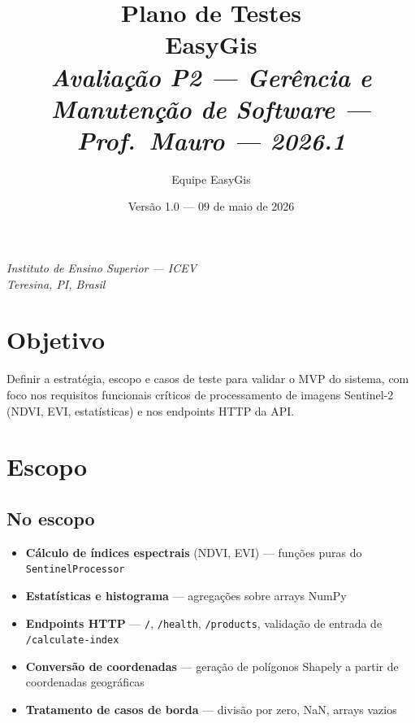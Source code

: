 \documentclass[11pt, a4paper]{article}
\title{%
  \vspace{-1.5cm}
  {\Huge\bfseries\color{accentdim} Plano de Testes}\\[8pt]
  {\Large\bfseries EasyGis}\\[18pt]
  {\normalsize\itshape Avaliação P2 --- Gerência e Manutenção de Software --- Prof.\ Mauro --- 2026.1}
}
\author{Equipe EasyGis}
\date{Versão 1.0 --- 09 de maio de 2026}
\begin{document}
\maketitle
\thispagestyle{empty}

\vfill
\begin{center}
\small\textit{Instituto de Ensino Superior --- ICEV}\\
\small\textit{Teresina, PI, Brasil}
\end{center}
\newpage

\tableofcontents
\newpage

\section{Objetivo}

Definir a estratégia, escopo e casos de teste para validar o MVP do sistema, com foco nos requisitos funcionais críticos de processamento de imagens Sentinel-2 (NDVI, EVI, estatísticas) e nos endpoints HTTP da API.

\section{Escopo}

\subsection{No escopo}

\begin{itemize}
  \item \textbf{Cálculo de índices espectrais} (NDVI, EVI) --- funções puras do \texttt{SentinelProcessor}
  \item \textbf{Estatísticas e histograma} --- agregações sobre arrays NumPy
  \item \textbf{Endpoints HTTP} --- \texttt{/}, \texttt{/health}, \texttt{/products}, validação de entrada de \texttt{/calculate-index}
  \item \textbf{Conversão de coordenadas} --- geração de polígonos Shapely a partir de coordenadas geográficas
  \item \textbf{Tratamento de casos de borda} --- divisão por zero, NaN, arrays vazios
\end{itemize}
\end{document}
